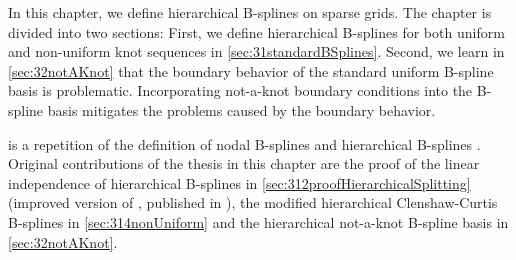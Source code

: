 In this chapter, we define hierarchical B-splines on sparse grids.
The chapter is divided into two sections:
First, we define hierarchical B-splines for both
uniform and non-uniform knot sequences in \cref{sec:31standardBSplines}.
Second, we learn in \cref{sec:32notAKnot} that the boundary behavior
of the standard uniform B-spline basis is problematic.
Incorporating not-a-knot boundary conditions into the B-spline basis
mitigates the problems caused by the boundary behavior.

 is a repetition of the definition
of nodal B-splines  and
hierarchical B-splines .
Original contributions of the thesis in this chapter are the proof of
the linear independence of hierarchical B-splines in
\cref{sec:312proofHierarchicalSplitting}
(improved version of \cite{Valentin14Hierarchische},
published in \cite{Valentin16Hierarchical}),
the modified hierarchical Clenshaw-Curtis B-splines in
\cref{sec:314nonUniform} and
the hierarchical not-a-knot B-spline basis in \cref{sec:32notAKnot}.






\cleardoublepage
